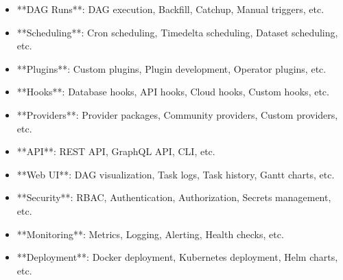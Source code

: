 \documentclass[11pt,a4paper]{article}
\begin{document}
\begin{itemize}
\item **DAG Runs**: DAG execution, Backfill, Catchup, Manual triggers, etc.
\end{itemize}

\begin{itemize}
\item **Scheduling**: Cron scheduling, Timedelta scheduling, Dataset scheduling, etc.
\end{itemize}

\begin{itemize}
\item **Plugins**: Custom plugins, Plugin development, Operator plugins, etc.
\end{itemize}

\begin{itemize}
\item **Hooks**: Database hooks, API hooks, Cloud hooks, Custom hooks, etc.
\end{itemize}

\begin{itemize}
\item **Providers**: Provider packages, Community providers, Custom providers, etc.
\end{itemize}

\begin{itemize}
\item **API**: REST API, GraphQL API, CLI, etc.
\end{itemize}

\begin{itemize}
\item **Web UI**: DAG visualization, Task logs, Task history, Gantt charts, etc.
\end{itemize}

\begin{itemize}
\item **Security**: RBAC, Authentication, Authorization, Secrets management, etc.
\end{itemize}

\begin{itemize}
\item **Monitoring**: Metrics, Logging, Alerting, Health checks, etc.
\end{itemize}

\begin{itemize}
\item **Deployment**: Docker deployment, Kubernetes deployment, Helm charts, etc.
\end{itemize}
\end{document}
